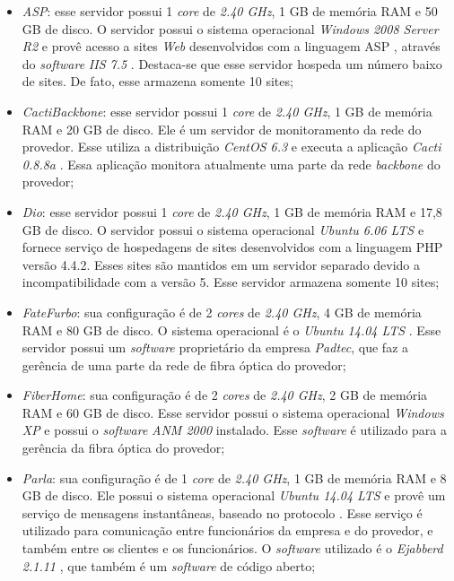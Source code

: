 \begin{itemize}
 \item \textit{ASP}: esse servidor possui 1 \textit{core} de \textit{2.40 GHz}, 1 GB de memória \ac{RAM} e 50 GB de disco. 
 O servidor possui o sistema operacional \textit{Windows 2008 Server R2} e provê acesso a sites \textit{Web} desenvolvidos com a linguagem 
 \ac{ASP} \cite{asp}, através do \textit{software} \textit{\ac{IIS} 7.5} \cite{iis}. Destaca-se que esse servidor hospeda um número baixo de sites.
 De fato, esse armazena somente 10 sites;
 
 \item \textit{CactiBackbone}: esse servidor possui 1 \textit{core} de \textit{2.40 GHz}, 1 GB de memória \ac{RAM} e 20 GB de disco. 
 Ele é um servidor de monitoramento da rede do provedor. Esse utiliza a distribuição \textit{CentOS 6.3} \cite{centos} e executa a aplicação 
 \textit{Cacti 0.8.8a} \cite{cacti}. Essa aplicação monitora atualmente uma parte da rede \textit{backbone} do provedor;
 
 \item \textit{Dio}: esse servidor possui 1 \textit{core} de \textit{2.40 GHz}, 1 GB de memória \ac{RAM} e 17,8 GB de disco. 
 O servidor possui o sistema operacional \textit{Ubuntu 6.06 \ac{LTS}} \cite{ubuntu} e fornece serviço de hospedagens de sites desenvolvidos com 
 a linguagem \ac{PHP} versão 4.4.2. Esses sites são mantidos em um servidor separado devido a incompatibilidade com a versão 5. Esse servidor 
 armazena somente 10 sites;
 
 \item \textit{FateFurbo}: sua configuração é de 2 \textit{cores} de \textit{2.40 GHz}, 4 GB de memória \ac{RAM} e 80 GB de disco. 
 O sistema operacional é o \textit{Ubuntu 14.04 \ac{LTS}} \cite{ubuntu}. Esse servidor possui um \textit{software} proprietário da empresa 
 \textit{Padtec}, que faz a gerência de uma parte da rede de fibra óptica do provedor;
 
 \item \textit{FiberHome}: sua configuração é de 2 \textit{cores} de \textit{2.40 GHz}, 2 GB de memória \ac{RAM} e 60 GB de disco. 
 Esse servidor possui o sistema operacional \textit{Windows XP} e possui o \textit{software} \textit{ANM 2000} instalado. Esse \textit{software} 
 é utilizado para a gerência da fibra óptica do provedor;
 
 \item \textit{Parla}: sua configuração é de 1 \textit{core} de \textit{2.40 GHz}, 1 GB de memória \ac{RAM} e 8 GB de disco. 
 Ele possui o sistema operacional \textit{Ubuntu 14.04 \ac{LTS}} \cite{ubuntu} e provê um serviço de mensagens instantâneas, baseado no protocolo 
  \cite{xmpp}. Esse serviço é utilizado para comunicação entre funcionários da empresa e do provedor, e também entre os clientes e 
 os funcionários. O \textit{software} utilizado é o \textit{Ejabberd 2.1.11} \cite{ejabberd}, que também é um \textit{software} de código aberto;


\end{itemize}
